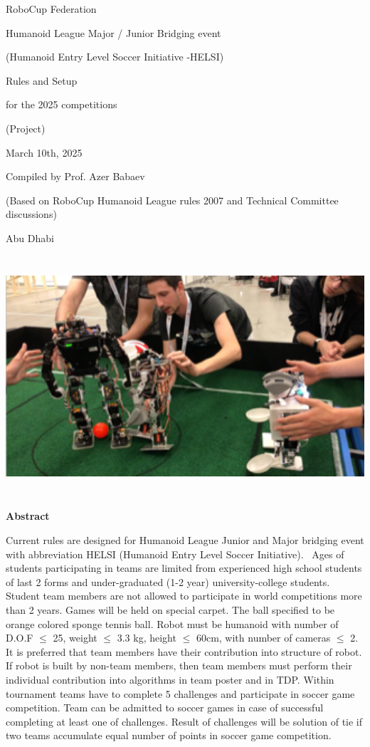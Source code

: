 \documentclass[a4paper]{article}
\begin{document}
{\centering 
\Large RoboCup Federation

\bigskip

\bigskip

Humanoid League Major / Junior Bridging event

\bigskip

(Humanoid Entry Level Soccer Initiative -HELSI)

\bigskip

\bigskip

Rules and Setup

for the 2025 competitions

(Project)

\bigskip

March 10th, 2025

Compiled by Prof. Azer Babaev

(Based on RoboCup Humanoid League rules 2007 and Technical Committee discussions)

Abu Dhabi
\par}
\bigskip
\bigskip
\includegraphics[width=16cm,height=8.95cm]{img/Demo_event_2018.png}
\bigskip
\bigskip
\bigskip
\bigskip
\bigskip
\newpage

{\centering
\textbf{\large Abstract}
\par}
\large
Current rules are designed for Humanoid League Junior and Major bridging event with abbreviation HELSI (Humanoid Entry
Level Soccer Initiative). \ Ages of students participating in teams are limited from experienced high school students
of last 2 forms and under-graduated (1-2 year) university-college students. Student team members are not allowed to
participate in world competitions more than 2 years. Games will be held on special carpet. The ball specified to be
orange colored sponge tennis ball. Robot must be humanoid with number of D.O.F ${\leq}$ 25, weight ${\leq}$ 3.3
kg, height ${\leq}$ 60cm, with number of cameras ${\leq}$ 2. It is preferred that team members have their
contribution into structure of robot. If robot is built by non-team members, then team members must perform their
individual contribution into algorithms in team poster and in TDP. Within tournament teams have to complete 5
challenges and participate in soccer game competition. Team can be admitted to soccer games in case of successful
completing at least one of challenges. Result of challenges will be solution of tie if two teams accumulate equal
number of points in soccer game competition. 
\end{document}
